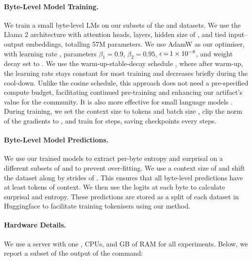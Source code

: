 \paragraph{Byte-Level Model Training.}
We train a small byte-level LMs on our subsets of the \fineweb and \commoncorpus datasets. 
We use the Llama 2 architecture with  attention heads,  layers, hidden size of , and tied input--output embeddings, totalling 57M parameters.
We use AdamW \citep{adam,loshchilov2018decoupled} as our optimiser, with learning rate , parameters $\beta_1\mathop{=}0.9$, $\beta_2\mathop{=}0.95$, $\epsilon\mathop{=}\num{1e-8}$, and weight decay set to .
We use the warm-up-stable-decay schedule \citep{zhai2022scaling}, where after warm-up, the learning rate stays constant for most training and decreases briefly during the cool-down. 
Unlike the cosine schedule, this approach does not need a pre-specified compute budget, facilitating continued pre-training and enhancing our artifact's value for the community. It is also more effective for small language models \citep{hu2024minicpm, wen2024understanding}.
During training, we set the context size to  tokens and batch size , clip the norm of the gradients to , and train for  steps, saving checkpoints every  steps.

\paragraph{Byte-Level Model Predictions.}

We use our trained models to extract per-byte entropy and surprisal on a different subsets of \fineweb and \commoncorpus to prevent over-fitting. We use a context size of  and shift the dataset along by strides of . This ensures that all byte-level predictions have at least  tokens of context. We then use the logits at each byte to calculate surprisal and entropy. These predictions are stored as a split of each dataset in Huggingface to facilitate training tokenisers using our method.

\paragraph{Hardware Details.}
We use a server with one ,  CPUs, and  GB of RAM for all experiments. Below, we report a subset of the output of the  command:

